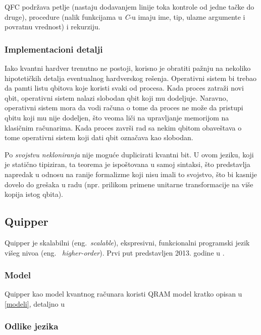 \documentclass[a4paper]{article}
\begin{document}
{QFC podržava petlje (nastaju dodavanjem linije toka kontrole od jedne tačke do druge), procedure (nalik funkcijama u \emph{C}-u imaju ime, tip, ulazne argumente i povratnu vrednost) i rekurziju.

\subsubsection{Implementacioni detalji}

Iako kvantni hardver trenutno ne postoji, korisno je obratiti pažnju na nekoliko hipotetičkih detalja eventualnog hardverskog rešenja. Operativni sistem bi trebao da pamti listu qbitova koje koristi svaki od procesa. Kada proces zatraži novi qbit, operativni sistem nalazi slobodan qbit koji mu dodeljuje. Naravno, operativni sistem mora da vodi računa o tome da proces ne može da pristupi qbitu koji mu nije dodeljen, što veoma liči na upravljanje memorijom na klasičnim računarima. Kada proces završi rad sa nekim qbitom obaveštava o tome operativni sistem koji dati qbit označava kao slobodan.

Po \textit{svojstvu nekloniranja} nije moguće duplicirati kvantni bit. U ovom jeziku, koji je statično tipiziran, ta teorema je ispoštovana u samoj sintaksi, što predstavlja napredak u odnosu na ranije formalizme koji nisu imali to svojstvo, što bi kasnije dovelo do grešaka u radu (npr. prilikom primene unitarne transformacije na više kopija istog qbita).

\subsection{Quipper}
\label{sec:quipper}

Quipper je skalabilni (eng.~\emph{scalable}), ekspresivni, funkcionalni programski jezik višeg nivoa (eng.~ \emph{higher-order}).
Prvi put predstavljen 2013. godine u \cite{quipper_language}.

\subsubsection{Model}

Quipper kao model kvantnog računara koristi QRAM model kratko opisan u \ref{modeli}, detaljno u \cite{qram_model} 


\subsubsection{Odlike jezika}

}
\end{document}
